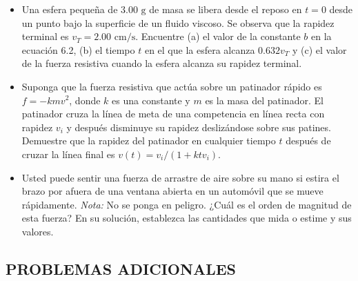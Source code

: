 \documentclass[11pt,a4paper]{article}
\begin{document}
\begin{itemize}
    \item[\textbf{21.}] Una esfera pequeña de $3.00 \text{ g}$ de masa se libera desde el reposo en $t = 0$ desde un punto bajo la superficie de un fluido viscoso. Se observa que la rapidez terminal es $v_T = 2.00 \text{ cm/s}$. Encuentre (a) el valor de la constante $b$ en la ecuación 6.2, (b) el tiempo $t$ en el que la esfera alcanza $0.632 v_T$ y (c) el valor de la fuerza resistiva cuando la esfera alcanza su rapidez terminal.
    \vspace*{7cm}
\end{itemize}

\newpage

\begin{itemize}
    \item[\textbf{22.}] Suponga que la fuerza resistiva que actúa sobre un patinador rápido es $f = -kmv^2$, donde $k$ es una constante y $m$ es la masa del patinador. El patinador cruza la línea de meta de una competencia en línea recta con rapidez $v_i$ y después disminuye su rapidez deslizándose sobre sus patines. Demuestre que la rapidez del patinador en cualquier tiempo $t$ después de cruzar la línea final es $v(t) = v_i / (1 + ktv_i)$.
    \vspace*{6cm}

    \item[\textbf{23.}] Usted puede sentir una fuerza de arrastre de aire sobre su mano si estira el brazo por afuera de una ventana abierta en un automóvil que se mueve rápidamente. \textit{Nota:} No se ponga en peligro. ¿Cuál es el orden de magnitud de esta fuerza? En su solución, establezca las cantidades que mida o estime y sus valores.
    \vspace*{6cm}
\end{itemize}

\subsection*{PROBLEMAS ADICIONALES}
\end{document}
